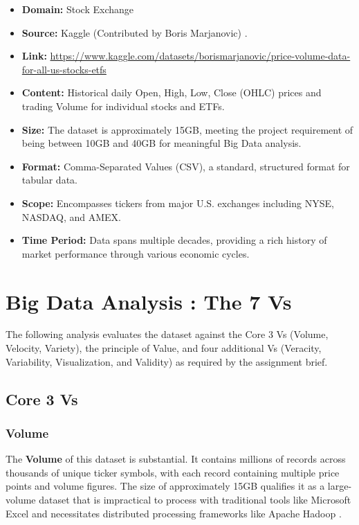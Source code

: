 \documentclass[12pt,a4paper]{article}
\begin{document}
\begin{itemize}
    \item \textbf{Domain:} Stock Exchange 
    \item \textbf{Source:} Kaggle (Contributed by Boris Marjanovic) \cite{ref1}.
    \item \textbf{Link:} \url{https://www.kaggle.com/datasets/borismarjanovic/price-volume-data-for-all-us-stocks-etfs}
    \item \textbf{Content:} Historical daily Open, High, Low, Close (OHLC) prices and trading Volume for individual stocks and ETFs.
    \item \textbf{Size:} The dataset is approximately 15GB, meeting the project requirement of being between 10GB and 40GB for meaningful Big Data analysis.
    \item \textbf{Format:} Comma-Separated Values (CSV), a standard, structured format for tabular data.
    \item \textbf{Scope:} Encompasses tickers from major U.S. exchanges including NYSE, NASDAQ, and AMEX.
    \item \textbf{Time Period:} Data spans multiple decades, providing a rich history of market performance through various economic cycles.
\end{itemize}

\section{Big Data Analysis : The 7 Vs}
The following analysis evaluates the dataset against the Core 3 Vs (Volume, Velocity, Variety), the principle of Value, and four additional Vs (Veracity, Variability, Visualization, and Validity) as required by the assignment brief.

\subsection{Core 3 Vs}

\subsubsection{Volume}
The \textbf{Volume} of this dataset is substantial. It contains millions of records across thousands of unique ticker symbols, with each record containing multiple price points and volume figures. The size of approximately 15GB qualifies it as a large-volume dataset that is impractical to process with traditional tools like Microsoft Excel and necessitates distributed processing frameworks like Apache Hadoop \cite{ref2}.
\end{document}
